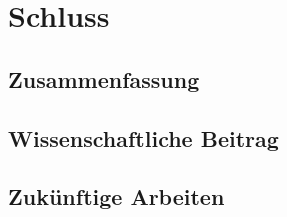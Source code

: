 \chapter{Schluss}

\section{Zusammenfassung}

\section{Wissenschaftliche Beitrag}

\section{Zukünftige Arbeiten}

